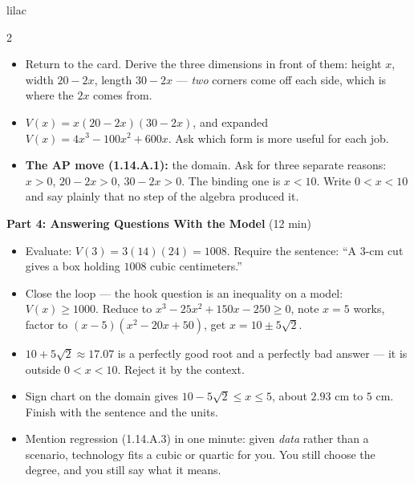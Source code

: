 \documentclass[10pt]{article}
\begin{document}
\begin{skillbox}[Lesson]{lilac}
\begin{multicols}{2}
\begin{itemize}
  \item Return to the card. Derive the three dimensions in front of them:
        height $x$, width $20 - 2x$, length $30 - 2x$ --- \textit{two} corners
        come off each side, which is where the $2x$ comes from.
  \item $V(x) = x(20-2x)(30-2x)$, and expanded
        $V(x) = 4x^3 - 100x^2 + 600x$. Ask which form is more useful for each
        job.
  \item \textbf{The AP move (1.14.A.1):} the domain. Ask for three separate
        reasons: $x > 0$, $20 - 2x > 0$, $30 - 2x > 0$. The binding one is
        $x < 10$. Write $0 < x < 10$ and say plainly that no step of the
        algebra produced it.
\end{itemize}

\textbf{Part 4: Answering Questions With the Model} (12 min)

\begin{itemize}
  \item Evaluate: $V(3) = 3(14)(24) = 1008$. Require the sentence: ``A
        $3$-cm cut gives a box holding $1008$ cubic centimeters.''
  \item Close the loop --- the hook question is an inequality on a model:
        $V(x) \ge 1000$. Reduce to $x^3 - 25x^2 + 150x - 250 \ge 0$, note
        $x = 5$ works, factor to $(x-5)(x^2 - 20x + 50)$, get
        $x = 10 \pm 5\sqrt{2}$.
  \item $10 + 5\sqrt{2} \approx 17.07$ is a perfectly good root and a
        perfectly bad answer --- it is outside $0 < x < 10$. Reject it by the
        context.
  \item Sign chart on the domain gives $10 - 5\sqrt{2} \le x \le 5$, about
        $2.93$ cm to $5$ cm. Finish with the sentence and the units.
  \item Mention regression (1.14.A.3) in one minute: given \textit{data}
        rather than a scenario, technology fits a cubic or quartic for you.
        You still choose the degree, and you still say what it means.
\end{itemize}
\end{multicols}
\end{skillbox}
\end{document}

